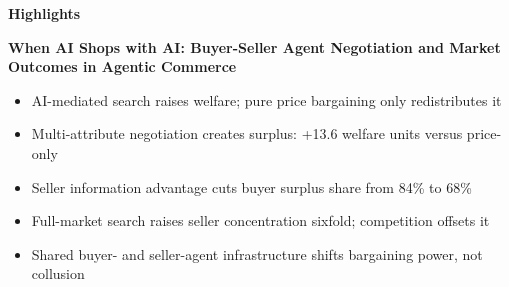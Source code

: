 \documentclass[12pt]{article}
\begin{document}
\begin{center}
{\Large \textbf{Highlights}}
\end{center}

\vspace{0.3cm}

\noindent\textbf{When AI Shops with AI: Buyer-Seller Agent Negotiation and Market Outcomes in Agentic Commerce}

\vspace{0.5cm}

\begin{itemize}
\item AI-mediated search raises welfare; pure price bargaining only redistributes it
\item Multi-attribute negotiation creates surplus: +13.6 welfare units versus price-only
\item Seller information advantage cuts buyer surplus share from 84\% to 68\%
\item Full-market search raises seller concentration sixfold; competition offsets it
\item Shared buyer- and seller-agent infrastructure shifts bargaining power, not collusion
\end{itemize}
\end{document}
